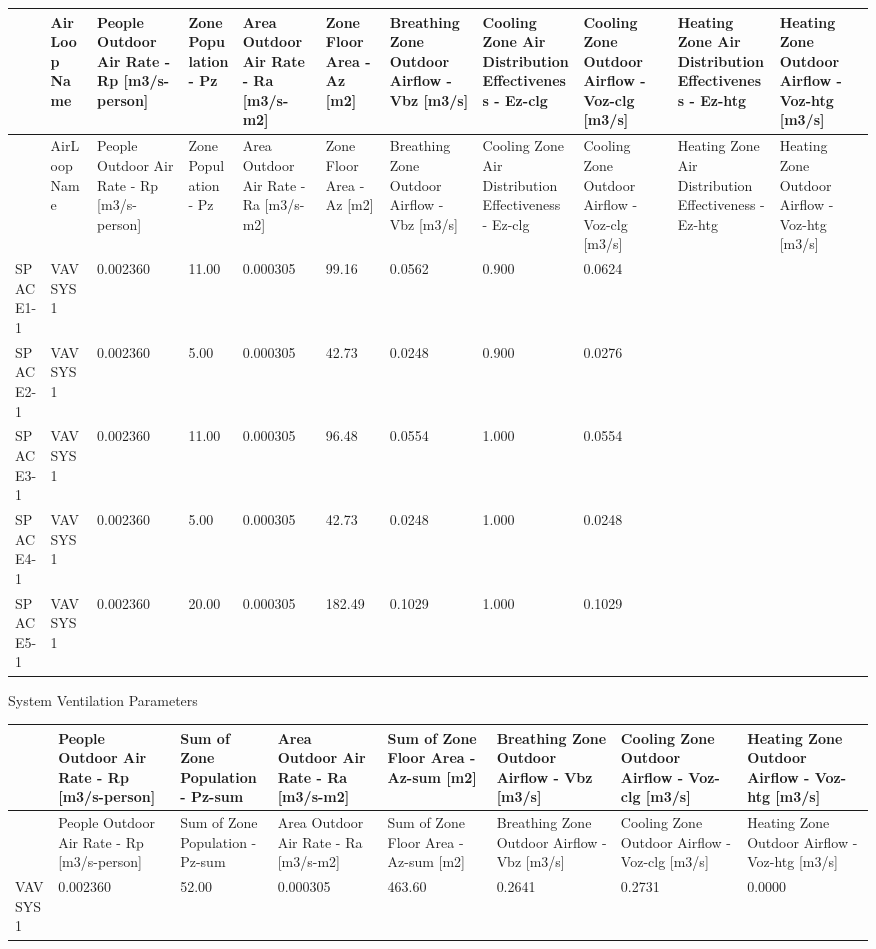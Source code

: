 {\scriptsize
\begin{longtable}[c]{>{\raggedright}p{0.54in}>{\raggedright}p{0.54in}>{\raggedright}p{0.54in}>{\raggedright}p{0.54in}>{\raggedright}p{0.54in}>{\raggedright}p{0.54in}>{\raggedright}p{0.54in}>{\raggedright}p{0.54in}>{\raggedright}p{0.54in}>{\raggedright}p{0.54in}>{\raggedright}p{0.54in}}
\toprule 
 & AirLoop Name & People Outdoor Air Rate - Rp [m3/s-person] & Zone Population - Pz & Area Outdoor Air Rate - Ra [m3/s-m2] & Zone Floor Area - Az [m2] & Breathing Zone Outdoor Airflow - Vbz [m3/s] & Cooling Zone Air Distribution Effectiveness - Ez-clg & Cooling Zone Outdoor Airflow - Voz-clg [m3/s] & Heating Zone Air Distribution Effectiveness - Ez-htg & Heating Zone Outdoor Airflow - Voz-htg [m3/s] \tabularnewline
\midrule
\endfirsthead

\toprule 
 & AirLoop Name & People Outdoor Air Rate - Rp [m3/s-person] & Zone Population - Pz & Area Outdoor Air Rate - Ra [m3/s-m2] & Zone Floor Area - Az [m2] & Breathing Zone Outdoor Airflow - Vbz [m3/s] & Cooling Zone Air Distribution Effectiveness - Ez-clg & Cooling Zone Outdoor Airflow - Voz-clg [m3/s] & Heating Zone Air Distribution Effectiveness - Ez-htg & Heating Zone Outdoor Airflow - Voz-htg [m3/s] \tabularnewline
\midrule
\endhead

SPACE1-1 & VAV SYS 1 & 0.002360 & 11.00 & 0.000305 & 99.16 & 0.0562 & 0.900 & 0.0624 & ~ & ~ \tabularnewline
SPACE2-1 & VAV SYS 1 & 0.002360 & 5.00 & 0.000305 & 42.73 & 0.0248 & 0.900 & 0.0276 & ~ & ~ \tabularnewline
SPACE3-1 & VAV SYS 1 & 0.002360 & 11.00 & 0.000305 & 96.48 & 0.0554 & 1.000 & 0.0554 & ~ & ~ \tabularnewline
SPACE4-1 & VAV SYS 1 & 0.002360 & 5.00 & 0.000305 & 42.73 & 0.0248 & 1.000 & 0.0248 & ~ & ~ \tabularnewline
SPACE5-1 & VAV SYS 1 & 0.002360 & 20.00 & 0.000305 & 182.49 & 0.1029 & 1.000 & 0.1029 & ~ & ~ \tabularnewline
\bottomrule
\end{longtable}}

System Ventilation Parameters

{\scriptsize
\begin{longtable}[c]{>{\raggedright}p{0.75in}>{\raggedright}p{0.75in}>{\raggedright}p{0.75in}>{\raggedright}p{0.75in}>{\raggedright}p{0.75in}>{\raggedright}p{0.75in}>{\raggedright}p{0.75in}>{\raggedright}p{0.75in}}
\toprule 
 & People Outdoor Air Rate - Rp [m3/s-person] & Sum of Zone Population - Pz-sum & Area Outdoor Air Rate - Ra [m3/s-m2] & Sum of Zone Floor Area - Az-sum [m2] & Breathing Zone Outdoor Airflow - Vbz [m3/s] & Cooling Zone Outdoor Airflow - Voz-clg [m3/s] & Heating Zone Outdoor Airflow - Voz-htg [m3/s] \tabularnewline
\midrule
\endfirsthead

\toprule 
 & People Outdoor Air Rate - Rp [m3/s-person] & Sum of Zone Population - Pz-sum & Area Outdoor Air Rate - Ra [m3/s-m2] & Sum of Zone Floor Area - Az-sum [m2] & Breathing Zone Outdoor Airflow - Vbz [m3/s] & Cooling Zone Outdoor Airflow - Voz-clg [m3/s] & Heating Zone Outdoor Airflow - Voz-htg [m3/s] \tabularnewline
\midrule
\endhead

VAV SYS 1 & 0.002360 & 52.00 & 0.000305 & 463.60 & 0.2641 & 0.2731 & 0.0000 \tabularnewline
\bottomrule
\end{longtable}}

